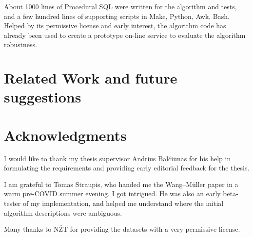 \documentclass[a4paper]{article}
\newcommand{\WM}{Wang--M{\"u}ller}
\begin{document}
About 1000 lines of Procedural SQL were written for the algorithm and tests,
and a few hundred lines of supporting scripts in Make, Python, Awk, Bash.
Helped by its permissive license and early interest, the algorithm code has
already been used to create a prototype on-line service to evaluate the
algorithm robustness.

\section{Related Work and future suggestions}
\label{sec:related_work}


\section{Acknowledgments}
\label{sec:acknowledgments}

I would like to thank my thesis supervisor Andrius Balčiūnas for his help in
formulating the requirements and providing early editorial feedback for the
thesis.

I am grateful to Tomas Straupis, who handed me the {\WM}\cite{wang1998line}
paper in a warm pre-COVID summer evening. I got intrigued. He was also an early
beta-tester of my implementation, and helped me understand where the initial
algorithm descriptions were ambiguous.

Many thanks to NŽT for providing the datasets with a very permissive license.

\printbibliography
\end{document}
